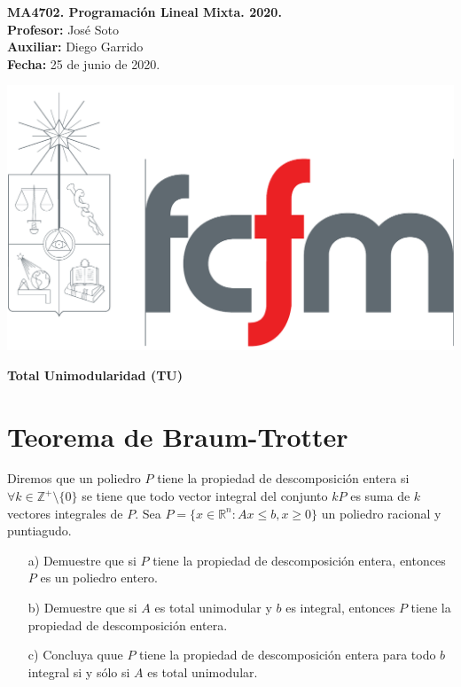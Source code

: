 \documentclass[10pt]{article}
\theoremstyle{plain}
\theoremstyle{definition}
\newcommand{\sca}{Diego Garrido}
\newcommand{\fecha}{25 de junio  de 2020}
\begin{document}
\vspace*{-1.2 cm}
\begin{minipage}{0.6\textwidth}
\begin{flushleft}
\hspace*{-0.5cm}\textbf{MA4702. Programación Lineal Mixta. 2020.}\\
\hspace*{-0.5cm}\textbf{Profesor:} José Soto\\
\hspace*{-0.5cm}\textbf{Auxiliar:} \sca\\
\hspace*{-0.5cm}\textbf{Fecha:} \fecha.
\end{flushleft}
\end{minipage}
\begin{minipage}{0.36\textwidth}
\begin{flushright}
\includegraphics[scale=0.15]{fcfm}
\end{flushright}
\end{minipage}
\bigskip

\begin{center}
\LARGE\textbf{Total Unimodularidad (TU)}
\end{center}


\section{Teorema de Braum-Trotter}

Diremos que un poliedro $P$ tiene la propiedad de descomposición entera si $\forall k \in \mathbb{Z}^{+}\setminus\{0\}$ se tiene que todo vector integral del conjunto $kP$ es suma de $k$ vectores integrales de $P$. Sea $P=\{x\in\mathbb{R}^{n}: Ax\leq b, x\geq 0\}$ un poliedro racional y puntiagudo.
\begin{itemize}
    \item[a)] Demuestre que si $P$ tiene la propiedad de descomposición entera, entonces $P$ es un poliedro entero.
    \item[b)] Demuestre que si $A$ es total unimodular y $b$ es integral, entonces $P$ tiene la propiedad de descomposición entera.
    \item[c)] Concluya quue $P$ tiene la propiedad de descomposición entera para todo $b$ integral si y sólo si $A$ es total unimodular.
\end{itemize}
\end{document}
